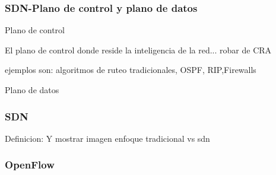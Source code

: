 \documentclass{beamer}
\begin{document}
\begin{frame}
\frametitle{SDN-Plano de control y plano de datos} 


\begin{block}{Plano de control}

El plano de control donde reside la inteligencia de la red... robar de CRA
\end{block}
ejemplos son: algoritmos de ruteo tradicionales, OSPF, RIP,Firewalls


\begin{block}{Plano de datos}
\end{block}




\end{frame}

\begin{frame}
\frametitle{SDN} 
Definicion:
Y mostrar imagen enfoque tradicional vs sdn

\end{frame}


%
%
%
%
%
%
%
%
%
%
%
%
%
%
%
%
%



\begin{frame}
\frametitle{OpenFlow} 

\end{frame}
\end{document}
